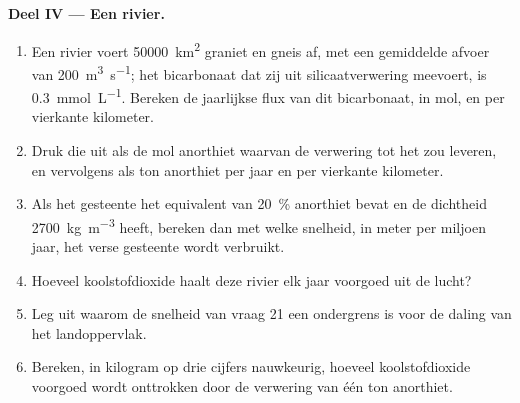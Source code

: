 \begin{problem}
\medskip
\noindent\textbf{Deel IV --- Een rivier.}
\begin{enumerate}[resume]
  \item Een rivier voert \qty{50000}{km^2} graniet en gneis af, met een gemiddelde afvoer van \qty{200}{m^3.s^{-1}}; het bicarbonaat dat zij uit silicaatverwering meevoert, is \qty{0.3}{mmol.L^{-1}}. Bereken de jaarlijkse flux van dit bicarbonaat, in mol, en per vierkante kilometer.
  \item Druk die uit als de mol anorthiet waarvan de verwering tot  het zou leveren, en vervolgens als ton anorthiet per jaar en per vierkante kilometer.
  \item Als het gesteente het equivalent van \qty{20}{\percent} anorthiet bevat en de dichtheid \qty{2700}{kg.m^{-3}} heeft, bereken dan met welke snelheid, in meter per miljoen jaar, het verse gesteente wordt verbruikt.
  \item Hoeveel koolstofdioxide haalt deze rivier elk jaar voorgoed uit de lucht?
  \item Leg uit waarom de snelheid van vraag 21 een ondergrens is voor de daling van het landoppervlak.
  \item Bereken, in kilogram op drie cijfers nauwkeurig, hoeveel koolstofdioxide voorgoed wordt onttrokken door de verwering van één ton anorthiet.
\end{enumerate}
\end{problem}
